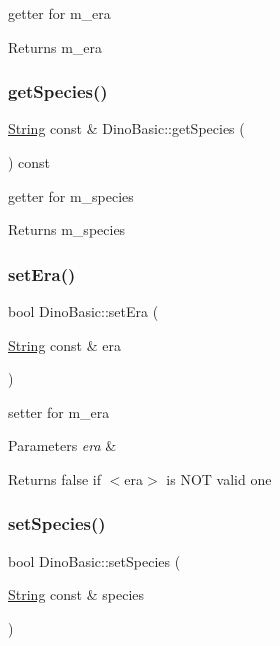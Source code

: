 getter for m\+\_\+era \begin{DoxyReturn}{Returns}
m\+\_\+era 
\end{DoxyReturn}
\mbox{\label{classDinoBasic_ac110aeb95cf5dd50c27c16097f2e46e1}} 
\subsubsection{\texorpdfstring{get\+Species()}{getSpecies()}}
{\footnotesize\ttfamily \hyperlink{classString}{String} const  \& Dino\+Basic\+::get\+Species (\begin{DoxyParamCaption}{ }\end{DoxyParamCaption}) const}

getter for m\+\_\+species \begin{DoxyReturn}{Returns}
m\+\_\+species 
\end{DoxyReturn}
\mbox{\label{classDinoBasic_a46451b705931279712c8203384e50c7d}} 
\subsubsection{\texorpdfstring{set\+Era()}{setEra()}}
{\footnotesize\ttfamily bool Dino\+Basic\+::set\+Era (\begin{DoxyParamCaption}\item[{\hyperlink{classString}{String} const \&}]{era }\end{DoxyParamCaption})}

setter for m\+\_\+era 
\begin{DoxyParams}{Parameters}
{\em era} & \\
\hline
\end{DoxyParams}
\begin{DoxyReturn}{Returns}
false if $<$era$>$ is N\+OT valid one 
\end{DoxyReturn}
\mbox{\label{classDinoBasic_aa2ee84eb530c70058c4b81ec6c879f85}} 
\subsubsection{\texorpdfstring{set\+Species()}{setSpecies()}}
{\footnotesize\ttfamily bool Dino\+Basic\+::set\+Species (\begin{DoxyParamCaption}\item[{\hyperlink{classString}{String} const \&}]{species }\end{DoxyParamCaption})}

